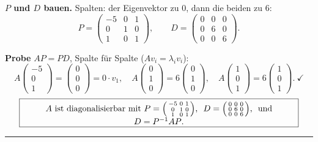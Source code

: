 \documentclass[a4paper,12pt]{article}
\newcommand{\EV}{Eigenvektor}
\begin{document}
\textbf{$P$ und $D$ bauen.} Spalten: der \EV{} zu $0$, dann die beiden zu $6$:
\[
P = \begin{pmatrix} -5 & 0 & 1 \\ 0 & 1 & 0 \\ 1 & 0 & 1 \end{pmatrix}, \qquad
D = \begin{pmatrix} 0 & 0 & 0 \\ 0 & 6 & 0 \\ 0 & 0 & 6 \end{pmatrix}.
\]

\textbf{Probe} $AP = PD$, Spalte f\"ur Spalte ($A v_i = \lambda_i v_i$):
\[
A\begin{pmatrix}-5\\0\\1\end{pmatrix} = \begin{pmatrix}0\\0\\0\end{pmatrix} = 0\cdot v_1,\quad
A\begin{pmatrix}0\\1\\0\end{pmatrix} = 6\begin{pmatrix}0\\1\\0\end{pmatrix},\quad
A\begin{pmatrix}1\\0\\1\end{pmatrix} = 6\begin{pmatrix}1\\0\\1\end{pmatrix}. \ \checkmark
\]
\[
\fbox{\parbox{0.93\textwidth}{\centering
$A$ ist diagonalisierbar mit
$P = \left(\begin{smallmatrix} -5 & 0 & 1 \\ 0 & 1 & 0 \\ 1 & 0 & 1 \end{smallmatrix}\right)$,
$\ D = \left(\begin{smallmatrix} 0 & 0 & 0 \\ 0 & 6 & 0 \\ 0 & 0 & 6 \end{smallmatrix}\right)$,
\ und $D = P^{-1}AP$.
}}
\]

\bigskip
\hrule
\bigskip
\end{document}
